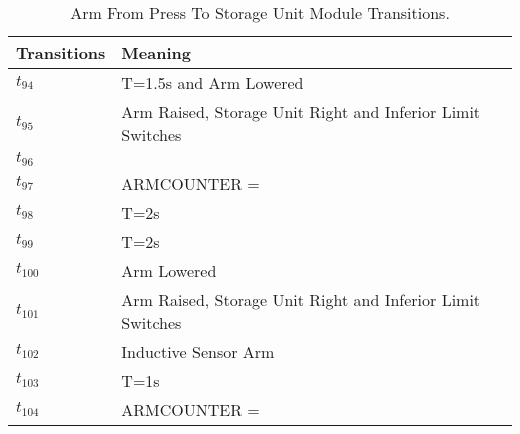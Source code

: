 \begin{table}[H]
\caption{Arm From Press To Storage Unit Module Transitions.}
\centering
\begin{tabular}{M{5cm}M{10cm}}
Transitions & Meaning\\
\hline
\hyperlink{partialNet:tt941}{\hypertarget{partialTable:tt94}{$t_{94}$}} & T=1.5s and Arm Lowered\\
\hyperlink{partialNet:t951}{\hypertarget{partialTable:t95}{$t_{95}$}} & Arm Raised, Storage Unit Right and Inferior Limit Switches\\
\hyperlink{partialNet:t961}{\hypertarget{partialTable:t96}{$t_{96}$}} & \\
\hyperlink{partialNet:t971}{\hypertarget{partialTable:t97}{$t_{97}$}} & ARMCOUNTER = \\
\hyperlink{partialNet:tt981}{\hypertarget{partialTable:tt98}{$t_{98}$}} & T=2s\\
\hyperlink{partialNet:tt991}{\hypertarget{partialTable:tt99}{$t_{99}$}} & T=2s\\
\hyperlink{partialNet:t1001}{\hypertarget{partialTable:t100}{$t_{100}$}} & Arm Lowered\\
\hyperlink{partialNet:t1011}{\hypertarget{partialTable:t101}{$t_{101}$}} & Arm Raised, Storage Unit Right and Inferior Limit Switches\\
\hyperlink{partialNet:t1021}{\hypertarget{partialTable:t102}{$t_{102}$}} & Inductive Sensor Arm\\
\hyperlink{partialNet:tt1031}{\hypertarget{partialTable:tt103}{$t_{103}$}} & T=1s\\
\hyperlink{partialNet:t1041}{\hypertarget{partialTable:t104}{$t_{104}$}} & ARMCOUNTER = \\
\end{tabular}
\end{table}
